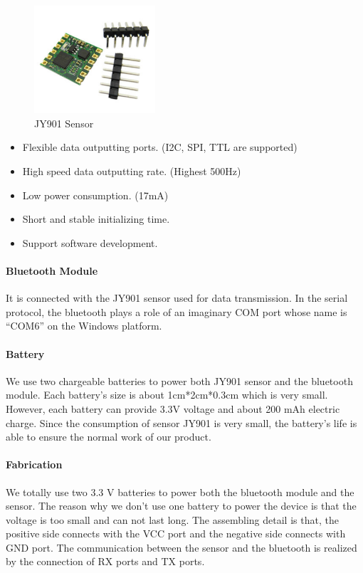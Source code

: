 \begin{figure}[H]
\centering
\includegraphics[width=0.4\textwidth]{Pics/imu}
\caption{JY901 Sensor}
\label{matcherStep1}
\end{figure}

\begin{itemize}
\item Flexible data outputting ports. (I2C, SPI, TTL are supported)
\item High speed data outputting rate. (Highest 500Hz)
\item Low power consumption. (17mA)
\item Short and stable initializing time. 
\item Support software development. 
\end{itemize}
\paragraph{Bluetooth Module}

It is connected with the JY901 sensor used for data transmission. In the serial
protocol, the bluetooth plays a role of an imaginary COM port whose name is
“COM6” on the Windows platform. 


\paragraph{Battery}

We use two chargeable batteries to power both JY901 sensor and the bluetooth
module. Each battery’s size is about 1cm*2cm*0.3cm which is very small. However,
each battery can provide 3.3V voltage and about 200 mAh electric charge. Since
the consumption of sensor JY901 is very small, the battery’s life is able to
ensure the normal work of our product. 


\paragraph{Fabrication}

We totally use two 3.3 V batteries to power both the bluetooth module and the
sensor. The reason why we don’t use one battery to power the device is that the
voltage is too small and can not last long. The assembling detail is that, the
positive side connects with the VCC port and the negative side connects with GND
port. The communication between the sensor and the bluetooth is realized by the
connection of RX ports and TX ports.  

